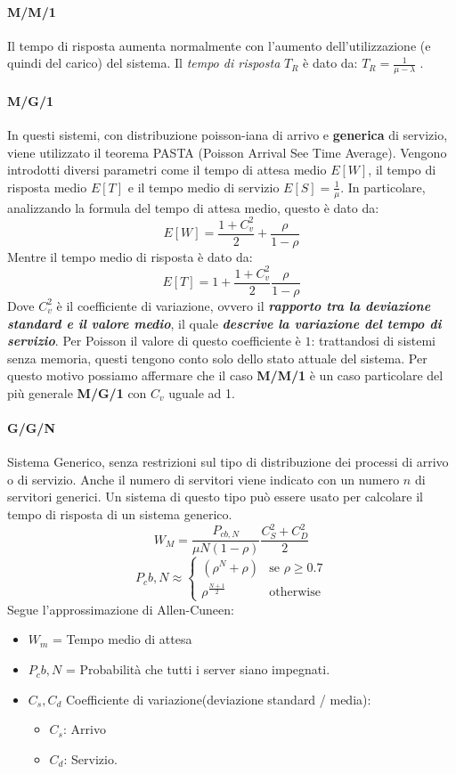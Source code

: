 \documentclass{article}
\begin{document}
		\paragraph{M/M/1}\label{mm1}
		Il tempo di risposta aumenta normalmente con l'aumento
		dell'utilizzazione (e quindi del carico) del sistema. Il \emph{tempo di
			risposta} \(T_R\) è dato da: \(T_R = \frac{1}{\mu-\lambda}\) .
		
		\paragraph{M/G/1}\label{mg1}
				
		In questi sistemi, con distribuzione poisson-iana di arrivo e \textbf{generica} di servizio, viene utilizzato il teorema PASTA
		(Poisson Arrival See Time Average). Vengono introdotti diversi
		parametri come il tempo di attesa medio \(E[W]\), il
		tempo di risposta medio \(E[T]\) e il
		tempo medio di servizio \(E[S]=\frac{1}{\mu}\). In
		particolare, analizzando la formula del tempo di attesa medio, questo è
		dato da: \[
		E[W] = \frac{1+C_v^2}{2}+\frac{\rho}{1-\rho}
		\]
		Mentre il tempo medio di risposta è dato da:
		\[
		E[T] = 1+\frac{1+C_v^2}{2}\frac{\rho}{1-\rho}
		\]
		Dove \(C_v^2\) è il coefficiente di variazione,
		ovvero il \textbf{\emph{rapporto tra la deviazione standard e il valore medio}}, il quale \textbf{\emph{descrive la variazione del tempo di	servizio}}. Per Poisson il valore di questo coefficiente è \(1\): trattandosi di sistemi senza memoria, questi tengono conto solo dello stato attuale del sistema. Per questo motivo possiamo affermare che il caso \textbf{M/M/1} è un caso particolare del più generale \textbf{M/G/1} con $C_v$ uguale ad 1.
		
			\paragraph{G/G/N}\label{ggn}
		Sistema Generico, senza restrizioni sul tipo di distribuzione dei
		processi di arrivo o di servizio. Anche il numero di servitori viene
		indicato con un numero \(n\) di servitori generici. Un sistema di questo
		tipo può essere usato per calcolare il tempo di risposta
		di un sistema generico.
		\[
		W_M = \frac{P_{cb,N}}{\mu N(1-\rho)}\frac{C^2_S+C^2_D}{2}
		\]
		\[
		P_cb,N \approx
		\begin{cases}
			(\rho^N+\rho) & \text{se $\rho \geq 0.7$}\\
			\rho^{\frac{N+1}{2}} & \text{otherwise}
		\end{cases}
		\]
		Segue l'approssimazione di Allen-Cuneen:
		\begin{itemize}
			\item $W_m$ = Tempo medio di attesa
			\item $P_cb,N$ = Probabilità che tutti i server siano impegnati.
			\item $C_s, C_d$ Coefficiente di variazione(deviazione standard / media):
			\begin{itemize}
				\item $C_s$: Arrivo
				\item $C_d$: Servizio.
			\end{itemize}
		\end{itemize}
		
\end{document}
